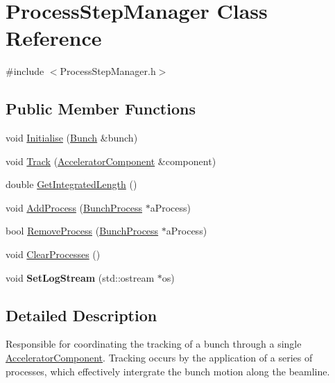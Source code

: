 \hypertarget{classProcessStepManager}{}\section{Process\+Step\+Manager Class Reference}
\label{classProcessStepManager}


{\ttfamily \#include $<$Process\+Step\+Manager.\+h$>$}

\subsection*{Public Member Functions}
\begin{DoxyCompactItemize}
\item 
void \hyperlink{classProcessStepManager_aecc48b51ff3d561b5e7e0e82d23b38b5}{Initialise} (\hyperlink{classBunch}{Bunch} \&bunch)
\item 
void \hyperlink{classProcessStepManager_acddc7adda6f07df634362afd97711a4e}{Track} (\hyperlink{classAcceleratorComponent}{Accelerator\+Component} \&component)
\item 
double \hyperlink{classProcessStepManager_ad8f5321c873d121e5419b6dc47313c00}{Get\+Integrated\+Length} ()
\item 
void \hyperlink{classProcessStepManager_ae4c8d521e07847880da29ebe02fc8f2d}{Add\+Process} (\hyperlink{classBunchProcess}{Bunch\+Process} $\ast$a\+Process)
\item 
bool \hyperlink{classProcessStepManager_a9795861d03d6eff0fecc49c98821f197}{Remove\+Process} (\hyperlink{classBunchProcess}{Bunch\+Process} $\ast$a\+Process)
\item 
void \hyperlink{classProcessStepManager_ab113f9ed035177beed45fe372a78843c}{Clear\+Processes} ()
\item 
\mbox{\label{classProcessStepManager_a25456ece693d527e96040e0c834fd9ec}} 
void {\bfseries Set\+Log\+Stream} (std\+::ostream $\ast$os)
\end{DoxyCompactItemize}


\subsection{Detailed Description}
Responsible for coordinating the tracking of a bunch through a single \hyperlink{classAcceleratorComponent}{Accelerator\+Component}. Tracking occurs by the application of a series of processes, which effectively intergrate the bunch motion along the beamline. 

